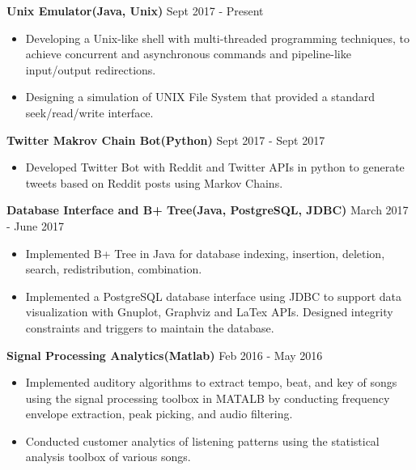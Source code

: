 \documentclass{article}
\begin{document}
\noindent
\textbf{Unix Emulator(Java, Unix)}
\hfill Sept 2017 - Present 
\begin{itemize}[leftmargin=*]
\vspace{-2.5mm}
\item Developing a Unix-like shell with multi-threaded programming techniques, to achieve concurrent and asynchronous commands and pipeline-like input/output redirections.
\vspace{-2.5mm}
\item Designing a simulation of UNIX File System that provided a standard
seek/read/write interface.
\end{itemize}
\vspace{-2.0mm}


\noindent
\textbf{Twitter Makrov Chain Bot(Python)}
\hfill Sept 2017 - Sept 2017
\begin{itemize}[leftmargin=*]
\vspace{-2.5mm}
\item Developed Twitter Bot with Reddit and Twitter APIs in python to generate tweets based on Reddit posts using Markov Chains.
\end{itemize}
\vspace{-2.0mm}

\noindent
\textbf{Database Interface and B+ Tree(Java, PostgreSQL, JDBC)}
\hfill March 2017 - June 2017 
\begin{itemize}[leftmargin=*]
\vspace{-2.5mm}
\item Implemented B+ Tree in Java for database indexing, insertion, deletion, search,
redistribution, combination.
\vspace{-2.5mm}
\item Implemented a PostgreSQL database interface using JDBC to support data visualization with Gnuplot, Graphviz and LaTex APIs. Designed integrity constraints and triggers to maintain the database.
\end{itemize}
\vspace{-2.0mm}



\noindent
\textbf{Signal Processing Analytics(Matlab)}
\hfill Feb 2016 - May 2016
\begin{itemize}[leftmargin=*]
\vspace{-2.5mm}
\item Implemented auditory algorithms to extract tempo, beat, and key of songs using the signal processing toolbox in MATALB by conducting frequency envelope extraction, peak picking, and audio filtering.
\vspace{-2.5mm}
\item Conducted customer analytics of listening patterns using the statistical analysis toolbox of various songs.
\end{itemize}
\end{document}
